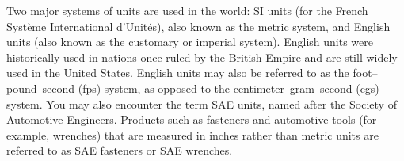 \documentclass{report}
\begin{document}
    \pagebreak 
    \bigbreak \noindent 
    Two major systems of units are used in the world: SI units (for the French Système International d’Unités), also known as the metric system, and English units (also known as the customary or imperial system). English units were historically used in nations once ruled by the British Empire and are still widely used in the United States. English units may also be referred to as the foot–pound–second (fps) system, as opposed to the centimeter–gram–second (cgs) system. You may also encounter the term SAE units, named after the Society of Automotive Engineers. Products such as fasteners and automotive tools (for example, wrenches) that are measured in inches rather than metric units are referred to as SAE fasteners or SAE wrenches.




    
\end{document}
